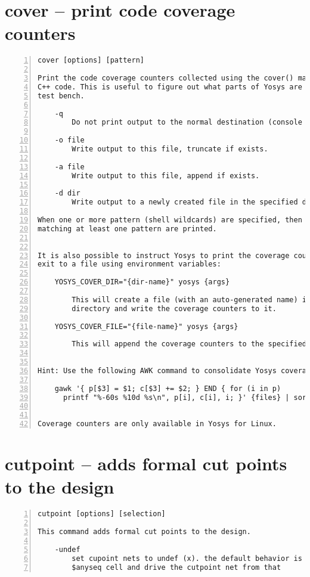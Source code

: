 \section{cover -- print code coverage counters}
\label{cmd:cover}
\begin{lstlisting}[numbers=left,frame=single]
    cover [options] [pattern]

Print the code coverage counters collected using the cover() macro in the Yosys
C++ code. This is useful to figure out what parts of Yosys are utilized by a
test bench.

    -q
        Do not print output to the normal destination (console and/or log file)

    -o file
        Write output to this file, truncate if exists.

    -a file
        Write output to this file, append if exists.

    -d dir
        Write output to a newly created file in the specified directory.

When one or more pattern (shell wildcards) are specified, then only counters
matching at least one pattern are printed.


It is also possible to instruct Yosys to print the coverage counters on program
exit to a file using environment variables:

    YOSYS_COVER_DIR="{dir-name}" yosys {args}

        This will create a file (with an auto-generated name) in this
        directory and write the coverage counters to it.

    YOSYS_COVER_FILE="{file-name}" yosys {args}

        This will append the coverage counters to the specified file.


Hint: Use the following AWK command to consolidate Yosys coverage files:

    gawk '{ p[$3] = $1; c[$3] += $2; } END { for (i in p)
      printf "%-60s %10d %s\n", p[i], c[i], i; }' {files} | sort -k3


Coverage counters are only available in Yosys for Linux.
\end{lstlisting}

\section{cutpoint -- adds formal cut points to the design}
\label{cmd:cutpoint}
\begin{lstlisting}[numbers=left,frame=single]
    cutpoint [options] [selection]

This command adds formal cut points to the design.

    -undef
        set cupoint nets to undef (x). the default behavior is to create a
        $anyseq cell and drive the cutpoint net from that
\end{lstlisting}

